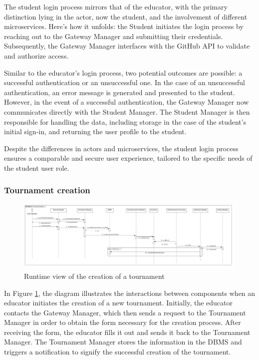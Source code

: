 The student login process mirrors that of the educator, with the primary distinction lying in the actor, now the student, and the involvement of different microservices. Here's how it unfolds: the Student initiates the login process by reaching out to the Gateway Manager and submitting their credentials. Subsequently, the Gateway Manager interfaces with the GitHub API to validate and authorize access.

Similar to the educator's login process, two potential outcomes are possible: a successful authentication or an unsuccessful one. In the case of an unsuccessful authentication, an error message is generated and presented to the student. However, in the event of a successful authentication, the Gateway Manager now communicates directly with the Student Manager. The Student Manager is then responsible for handling the data, including storage in the case of the student's initial sign-in, and returning the user profile to the student.

Despite the differences in actors and microservices, the student login process ensures a comparable and secure user experience, tailored to the specific needs of the student user role.

\newpage

\subsubsection*{Tournament creation}
\begin{figure}[h!]
    \centering
    \includegraphics[width=1.3\linewidth, angle=90]{2.ArchitecturalDesign/res/TournamentCreation.jpg}
    \caption{Runtime view of the creation of a tournament}
    \label{fig:tournament_creation}
\end{figure}

In Figure \ref{fig:tournament_creation}, the diagram illustrates the interactions between components when an educator initiates the creation of a new tournament. Initially, the educator contacts the Gateway Manager, which then sends a request to the Tournament Manager in order to obtain the form necessary for the creation process. After receiving the form, the educator fills it out and sends it back to the Tournament Manager. The Tournament Manager stores the information in the DBMS and triggers a notification to signify the successful creation of the tournament. 

